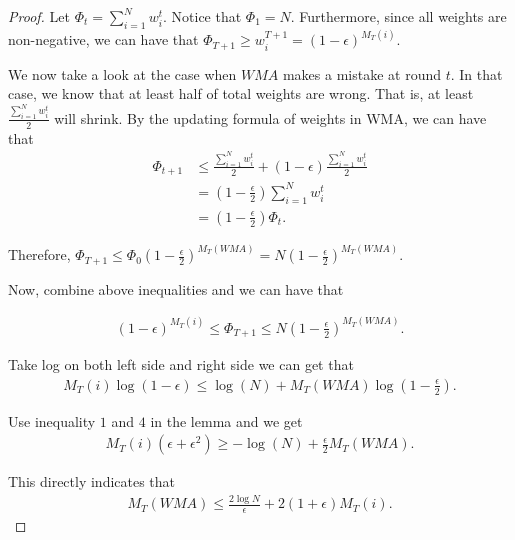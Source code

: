 \documentclass[../main.tex]{subfiles}
\begin{document}
\begin{proof}
	Let $\Phi_t = \sum\limits_{i = 1}^N w_i^t$. Notice that $\Phi_1 = N$. Furthermore, since all weights are non-negative, we can have that $\Phi_{T+1}  \geq w_i^{T+1} = (1-\epsilon)^{M_T(i)}$.
	
	We now take a look at the case when $WMA$ makes a mistake at round $t$. In that case, we know that at least half of total weights are wrong. That is, at least $\frac{\sum\limits_{i = 1}^N w_i^t}{2}$ will shrink. By the updating formula of weights in WMA, we can have that 
	\begin{equation*}
	\begin{aligned}
			\Phi_{t+1} &\leq \frac{\sum\limits_{i = 1}^N w_i^t}{2} + (1-\epsilon)\frac{\sum\limits_{i = 1}^N w_i^t}{2}\\
			& = (1- \frac{\epsilon}{2}) \sum\limits_{i = 1}^N w_i^t\\
			& = (1- \frac{\epsilon}{2}) \Phi_t.
	\end{aligned}
	\end{equation*}
	
	Therefore, $\Phi_{T+1} \leq \Phi_0 (1-\frac{\epsilon}{2})^{M_T(WMA)} = N(1-\frac{\epsilon}{2})^{M_T(WMA)}$.
	
	Now, combine above inequalities and we can have that
	
	\begin{equation*}
		\begin{aligned}
			(1-\epsilon)^{M_T(i)} \leq \Phi_{T+1} \leq  N(1-\frac{\epsilon}{2})^{M_T(WMA)}.
		\end{aligned}
	\end{equation*}
	
	Take log on both left side and right side we can get that
	\begin{equation*}
		\begin{aligned}
			M_T(i) \log(1-\epsilon) \leq \log(N) + M_T(WMA)\log(1-\frac{\epsilon}{2}).
		\end{aligned}
	\end{equation*}
	
	Use inequality $1$ and $4$ in the lemma and we get
	\begin{equation*}
	\begin{aligned}
	M_T(i) (\epsilon + \epsilon^2) \geq -\log(N) + \frac{\epsilon}{2}  M_T(WMA).
	\end{aligned}
	\end{equation*}
	
	This directly indicates that 
	\begin{equation*}
	\begin{aligned}
	M_T(WMA) \leq \frac{2\log N}{\epsilon} + 2 (1 + \epsilon) M_T(i) .
	\end{aligned}
	\end{equation*}
\end{proof}
\end{document}
